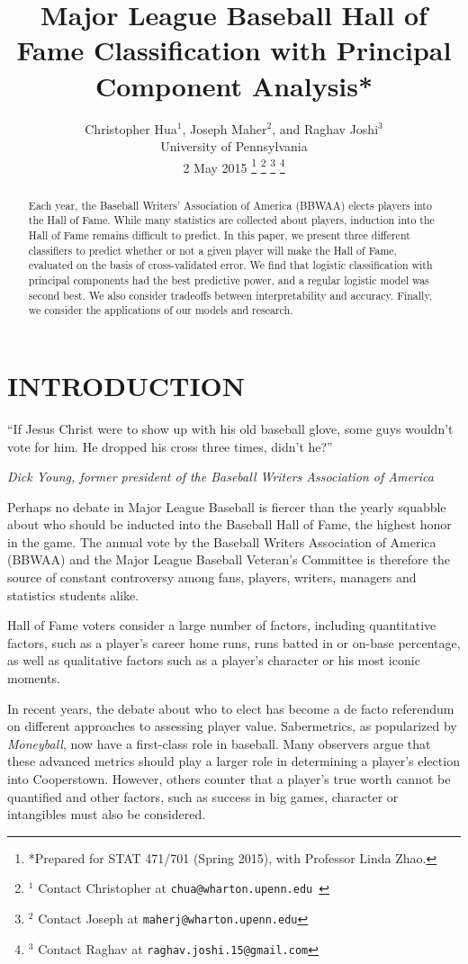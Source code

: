 \documentclass[letterpaper, 10 pt, conference]{ieeeconf}
\title{\LARGE \bf
Major League Baseball Hall of Fame Classification with Principal Component Analysis*
}
\author{Christopher Hua$^{1}$, Joseph Maher$^{2}$, and Raghav Joshi$^{3}$
\\University of Pennsylvania
\\2 May 2015 %
\thanks{*Prepared for STAT 471/701 (Spring 2015), with Professor Linda Zhao.}%
\thanks{$^{1}$ Contact Christopher at {\tt\small chua@wharton.upenn.edu }}%
\thanks{$^{2}$ Contact Joseph at {\tt\small maherj@wharton.upenn.edu}}%
\thanks{$^{3}$ Contact Raghav at {\tt\small raghav.joshi.15@gmail.com}}%
}
\begin{document}
\maketitle
\thispagestyle{plain}
\pagestyle{plain}

\begin{abstract}

Each year, the Baseball Writers’ Association of America (BBWAA) elects players into the Hall of Fame. While many statistics are collected about players, induction into the Hall of Fame remains difficult to predict. In this paper, we present three different classifiers to predict whether or not a given player will make the Hall of Fame, evaluated on the basis of cross-validated error. We find that logistic classification with principal components had the best predictive power, and a regular logistic model was second best. We also consider tradeoffs between interpretability and accuracy. Finally, we consider the applications of our models and research.

\end{abstract}


\section{INTRODUCTION}

\epigraph{``If Jesus Christ were to show up with his old baseball glove, some guys wouldn't vote for him. He dropped his cross three times, didn't he?''}{\textit{Dick Young, former president of the Baseball Writers Association of America}}

Perhaps no debate in Major League Baseball is fiercer than the yearly squabble about who should be inducted into the Baseball Hall of Fame, the  highest honor in the game. The annual vote by the Baseball Writers Association of America (BBWAA) and the Major League Baseball Veteran's Committee is therefore the source of constant controversy among fans, players, writers, managers and statistics students alike. 

Hall of Fame voters consider a large number of factors, including quantitative factors, such as a player's career home runs, runs batted in or on-base percentage, as well as qualitative factors such as a player’s character or his most iconic moments. 

In recent years, the debate about who to elect has become a de facto referendum on different approaches to assessing player value. Sabermetrics, as popularized by \textit{Moneyball}, now have a first-class role in baseball. Many observers argue that these advanced metrics should play a larger role in determining a player's election into Cooperstown. However, others counter that a player's true worth cannot be quantified and other factors, such as success in big games, character or intangibles must also be considered. 
\end{document}
